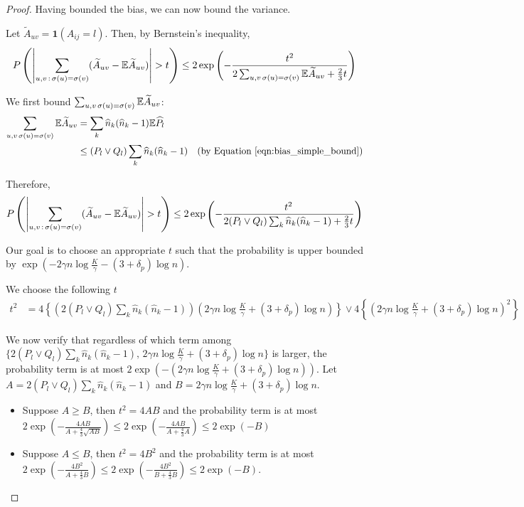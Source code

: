 \begin{proof}
Having bounded the bias, we can now bound the variance.


Let $ \tilde{A}_{uv} = \mathbf{1}(A_{ij} = l)$. Then, by Bernstein's inequality,
\[
P\left( \left| \sum_{u,v\,:\, \sigma(u) = \sigma(v)} (\widetilde{A}_{uv} - {\mathbb E} \widetilde{A}_{uv} ) \right|  > t 
 \right) \leq 2 \exp\left( 
    - \frac{t^2}{ 2 \sum_{u,v \, \sigma(u) = \sigma(v)} {\mathbb E} \widetilde{A}_{uv}  + \frac{2}{3}t } 
\right)
\]

We first bound $\sum_{u,v \, \sigma(u) = \sigma(v)} {\mathbb E} \widetilde{A}_{uv}$:
\begin{align*}
\sum_{u,v \, \sigma(u) = \sigma(v)} {\mathbb E} \widetilde{A}_{uv} &=
  \sum_k \widehat{n}_k (\widehat{n}_k - 1) {\mathbb E} \widehat{P}_l \\
 &\leq (P_l \vee Q_l) \sum_k \widehat{n}_k (\widehat{n}_k - 1) \quad 
  \textrm{(by Equation~\ref{eqn:bias_simple_bound})}
\end{align*}

Therefore,
\[
P\left( \left| \sum_{u,v\,:\, \sigma(u) = \sigma(v)} (\widetilde{A}_{uv} - {\mathbb E} \widetilde{A}_{uv} ) \right|  > t 
 \right) \leq 2 \exp\left( 
    - \frac{t^2}{ 2 (P_l \vee Q_l) \sum_k \widehat{n}_k (\widehat{n}_k - 1)  + \frac{2}{3}t } 
\right)
\]

Our goal is to choose an appropriate $t$ such that the probability is upper bounded by $\exp( - 2 \gamma n \log \frac{K}{\gamma} - (3+\delta_p) \log n )$. 

We choose the following $t$
\begin{align*}
t^2 &= 4 \left\{  \left( 2 (P_l \vee Q_l) \sum_k \hat{n}_k (\hat{n}_k - 1) \right) 
      \left( 
    2 \gamma n \log \frac{K}{\gamma} + (3+\delta_p) \log n \right) \right\} 
      \vee 
   4  \left\{
   \left( 2 \gamma n \log \frac{K}{\gamma} + (3 + \delta_p) \log n \right)^2 \right\} 
\end{align*}

We now verify that regardless of which term among $\{ 2 (P_l \vee Q_l) \sum_k \hat{n}_k (\hat{n}_k - 1) ,\,  2 \gamma n \log \frac{K}{\gamma} + (3+\delta_p) \log n\}$ is larger, the probability term is at most $2 \exp\left( -  \left( 2 \gamma n \log \frac{K}{\gamma} + (3+\delta_p) \log n \right) \right)$. Let $A = 2(P_l \vee Q_l)\sum_k \hat{n}_k (\hat{n}_k - 1)$ and
 $B =  2 \gamma n \log \frac{K}{\gamma} + (3+\delta_p) \log n$. 

\begin{itemize}
\item Suppose $A \geq B$, then $t^2 = 4AB$ and the probability term is at most
    $2 \exp \left( - \frac{4 AB}{A + \frac{4}{3} \sqrt{AB}} \right)  \leq 2 \exp \left( - \frac{4 AB}{A + \frac{4}{3} A} \right) \leq  2 \exp( - B )$ 
\item Suppose $A \leq B$, then $t^2 = 4B^2$ and the probability term is at most
       $2 \exp \left( - \frac{4 B^2}{A + \frac{4}{3} B} \right) \leq 2 \exp \left( - \frac{4 B^2}{ B + \frac{4}{3} B} \right) \leq 2 \exp( - B)$. 
\end{itemize}


\end{proof}
